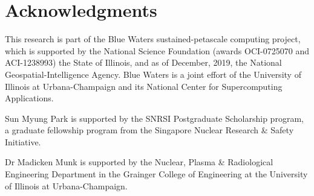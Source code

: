 \section{Acknowledgments}

This research is part of the Blue Waters sustained-petascale computing project,
which is supported by the National Science Foundation (awards OCI-0725070 and
ACI-1238993) the State of Illinois, and as of December, 2019, the National
Geospatial-Intelligence Agency. Blue Waters is a joint effort of the University
of Illinois at Urbana-Champaign and its National Center for Supercomputing
Applications.

Sun Myung Park is supported by the SNRSI Postgraduate Scholarship program, a
graduate fellowship program from the Singapore Nuclear Research \& Safety
Initiative.

Dr Madicken Munk is supported by the Nuclear, Plasma \& Radiological
Engineering Department in the Grainger College of Engineering at the University
of Illinois at Urbana-Champaign.

